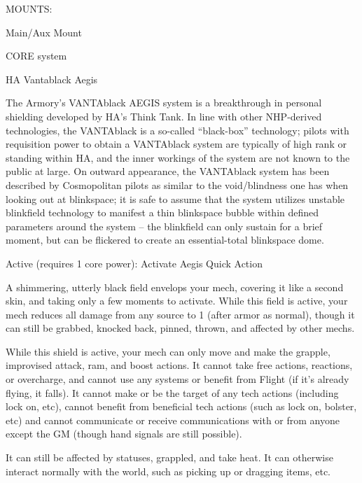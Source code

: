                                                  MOUNTS: 

 Main/Aux Mount 

                                               CORE system 

                                                                                                          


                                                HA Vantablack Aegis  

 The Armory’s VANTAblack AEGIS system is a breakthrough in personal shielding developed by HA’s  
 Think Tank. In line with other NHP-derived technologies, the VANTAblack is a so-called “black-box”  
 technology; pilots with requisition power to obtain a VANTAblack system are typically of high rank or  
 standing within HA, and the inner workings of the system are not known to the public at large. On  
 outward appearance, the VANTAblack system has been described by Cosmopolitan pilots as similar to  
 the void/blindness one has when looking out at blinkspace; it is safe to assume that the system utilizes  
 unstable blinkfield technology to manifest a thin blinkspace bubble within defined parameters around  
 the system -- the blinkfield can only sustain for a brief moment, but can be flickered to create an  
 essential-total blinkspace dome.       

 Active (requires 1 core power): Activate Aegis  
 Quick Action
 
 A shimmering, utterly black field envelops your mech, covering it like a second skin, and taking only a  
 few moments to activate. While this field is active, your mech reduces all damage from any source to 1  
 (after armor as normal), though it can still be grabbed, knocked back, pinned, thrown, and affected by  
 other mechs.
 

 While this shield is active, your mech can only move and make the grapple, improvised attack, ram,  
 and boost actions. It cannot take free actions, reactions, or overcharge, and cannot use any systems or  
 benefit from Flight (if it’s already flying, it falls). It cannot make or be the target of any tech actions  
 (including lock on, etc), cannot benefit from beneficial tech actions (such as lock on, bolster, etc) and  
 cannot communicate or receive communications with or from anyone except the GM (though hand  
 signals are still possible). 
 

  It can still be affected by statuses, grappled, and take heat. It can otherwise interact normally with the  
 world, such as picking up or dragging items, etc.
 

